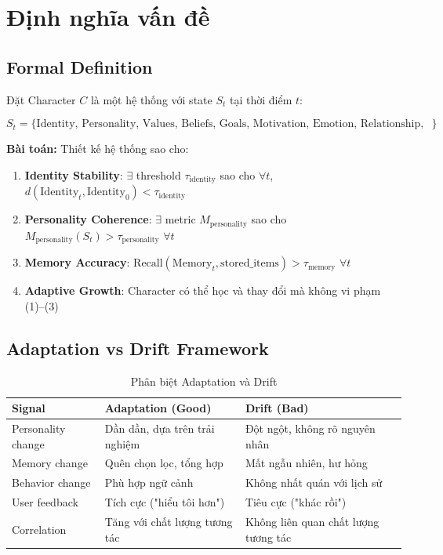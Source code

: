 \section{Định nghĩa vấn đề}

\subsection{Formal Definition}

Đặt Character $C$ là một hệ thống với state $S_t$ tại thời điểm $t$:

\begin{equation}
S_t = \{\text{Identity, Personality, Values, Beliefs, Goals, Motivation, Emotion, Relationship, Memory, Knowledge, Habits, Preferences, WorldState}\}
\end{equation}

\textbf{Bài toán:} Thiết kế hệ thống sao cho:
\begin{enumerate}
    \item \textbf{Identity Stability}: $\exists$ threshold $\tau_{\text{identity}}$ sao cho $\forall t$, $d(\text{Identity}_t, \text{Identity}_0) < \tau_{\text{identity}}$
    \item \textbf{Personality Coherence}: $\exists$ metric $M_{\text{personality}}$ sao cho $M_{\text{personality}}(S_t) > \tau_{\text{personality}}$ $\forall t$
    \item \textbf{Memory Accuracy}: $\text{Recall}(\text{Memory}_t, \text{stored\_items}) > \tau_{\text{memory}}$ $\forall t$
    \item \textbf{Adaptive Growth}: Character có thể học và thay đổi mà không vi phạm (1)--(3)
\end{enumerate}

\subsection{Adaptation vs Drift Framework}

\begin{table}[H]
\centering
\caption{Phân biệt Adaptation và Drift}
\label{tab:adaptation-drift}
\begin{tabular}{lll}
\toprule
\textbf{Signal} & \textbf{Adaptation (Good)} & \textbf{Drift (Bad)} \\
\midrule
Personality change & Dần dần, dựa trên trải nghiệm & Đột ngột, không rõ nguyên nhân \\
Memory change & Quên chọn lọc, tổng hợp & Mất ngẫu nhiên, hư hỏng \\
Behavior change & Phù hợp ngữ cảnh & Không nhất quán với lịch sử \\
User feedback & Tích cực ("hiểu tôi hơn") & Tiêu cực ("khác rồi") \\
Correlation & Tăng với chất lượng tương tác & Không liên quan chất lượng tương tác \\
\bottomrule
\end{tabular}
\end{table}

